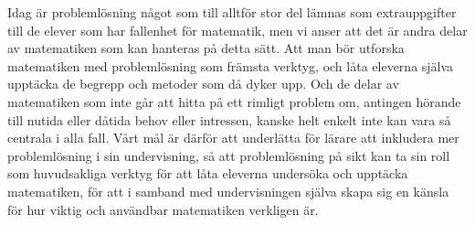 \textcolor{lila}{Idag är problemlösning något som till alltför stor del lämnas som extrauppgifter till de elever som har fallenhet för matematik, men vi anser att det är andra delar av matematiken som kan hanteras på detta sätt. Att man bör utforska matematiken med problemlösning som främsta verktyg, och låta eleverna själva upptäcka de begrepp och metoder som då dyker upp. Och de delar av matematiken som inte går att hitta på ett rimligt problem om, antingen hörande till nutida eller dåtida behov eller intressen, kanske helt enkelt inte kan vara så centrala i alla fall.}
\textcolor{Mahogany}{Vårt mål är därför att underlätta för lärare att inkludera mer problemlösning i sin undervisning, så att problemlösning på sikt kan ta sin roll som huvudsakliga verktyg för att låta eleverna undersöka och upptäcka matematiken, för att i samband med undervisningen själva skapa sig en känsla för hur viktig och användbar matematiken verkligen är.}

